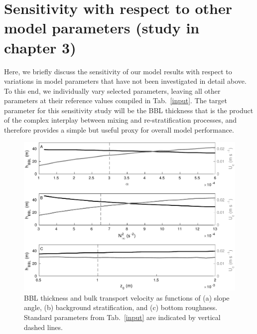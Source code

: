 \chapter{Sensitivity with respect to other model 
parameters (study in chapter 3)}\label{sensitivitystudy}

Here, we briefly discuss the sensitivity of our model results with
respect to variations in model parameters that have not been
investigated in detail above. To this end, we individually vary
selected parameters, leaving all other parameters at their reference
values compiled in Tab.\ \ref{input}. The target parameter for this
sensitivity study will be the BBL thickness that is the product of the
complex interplay between mixing and re-stratification processes, and
therefore provides a simple but useful proxy for overall model
performance.

\begin{figure}[ht]
  \noindent\includegraphics[width=35pc]{sensitivity.pdf}
  \caption{BBL thickness and bulk transport velocity as functions of
    (a) slope angle, (b) background stratification, and (c) bottom
    roughness. Standard parameters from Tab.\ \ref{input} are
    indicated by vertical dashed lines. }
  \label{sensitivity}
\end{figure}


